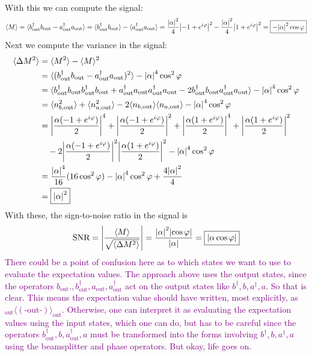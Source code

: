 \documentclass{article}
\theoremstyle{definition}
\newcommand{\al}{\alpha}
\newcommand{\f}[2]{\frac{#1}{#2}}
\begin{document}
\begin{enumerate}[label=(\alph*)]
\begin{align*}
\end{align*}
With this we can compute the signal:
\begin{align*}
\langle M \rangle = \langle b_\text{out}^\dagger b_\text{out} - a_\text{out}^\dagger a_\text{out} \rangle 
= \langle b_\text{out}^\dagger b_\text{out} \rangle - \langle a_\text{out}^\dagger a_\text{out} \rangle 
= \f{\abs{\al}^2}{4}\abs{-1+e^{i\varphi}}^2  - \f{\abs{\al}^2}{4} \abs{1+e^{i\varphi}}^2 
= \boxed{- \abs{\al}^2 \cos\varphi }
\end{align*}
Next we compute the variance in the signal:
\begin{align*}
\langle \Delta M^2 \rangle 
&= \langle M^2\rangle - \langle M \rangle^2\\ 
&= \langle (b_\text{out}^\dagger b_\text{out} - a_\text{out}^\dagger a_\text{out})^2 \rangle - \abs{\al}^4\cos^2\varphi \\ 
&= \langle  b_\text{out}^\dagger b_\text{out} b_\text{out}^\dagger b_\text{out} + 
a_\text{out}^\dagger a_\text{out}a_\text{out}^\dagger a_\text{out}  
- 2 b_\text{out}^\dagger b_\text{out}a_\text{out}^\dagger a_\text{out} \rangle - \abs{\al}^4 \cos^2\varphi\\ 
&= \langle n^2_{b,\text{out}} \rangle + \langle n^2_{a,\text{out}} \rangle 
-2 \langle n_{b,\text{out}} \rangle  \langle n_{a,\text{out}} \rangle - \abs{\al}^4 \cos^2 \varphi \\ 
&= \abs{\f{\al(-1 + e^{i\varphi})}{2}}^4 + \abs{\f{\al(-1 + e^{i\varphi})}{2}}^2 
+ \abs{\f{\al(1+ e^{i\varphi})}{2}}^4 + \abs{\f{\al(1+ e^{i\varphi})}{2}}^2 \\
&\quad - 2 \abs{\f{\al(-1 + e^{i\varphi})}{2}}^2 \abs{ \f{\al(1 + e^{i\varphi})}{2}}^2 
- \abs{\al}^4\cos^2\varphi\\
&= \f{\abs{\al}^4}{16}( 16 \cos^2\varphi  ) - \abs{\al}^4 \cos^2\varphi
+ \f{4\abs{\al}^2}{4}\\
&= \boxed{\abs{\al}^2}
\end{align*}
With these, the sign-to-noise ratio in the signal is 
\begin{align*}
\text{SNR} = \abs{ \f{\langle M\rangle}{\sqrt{\langle \Delta M^2 \rangle}} }= \f{\abs{\al}^2 \abs{ \cos\varphi}}{\abs{\al}} = \boxed{\abs{\al \cos\varphi}}
\end{align*}
\textcolor{purple}{There could be a point of confusion here as to which states we want to use to evaluate the expectation values. The approach above uses the output states, since the operators $b_\text{out}., b_\text{out}^\dagger, a_\text{out}, a_\text{out}^\dagger$ act on the output states like $b^\dagger, b, a^\dagger, a$. So that is clear. This means the expectation value should have written, most explicitly, as $_\text{out} \langle (\text{-out-}) \rangle_\text{out}$. Otherwise, one can interpret it as evaluating the expectation values using the input states, which one can do, but has to be careful since the operators $b_\text{out}^\dagger, b, a_\text{out}^\dagger, a$ must be transformed into the forms involving $b^\dagger, b, a^\dagger, a$ using the beamsplitter and phase operators. But okay, life goes on.}




\end{enumerate}
\end{document}
